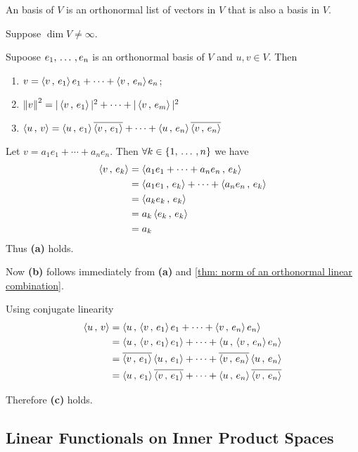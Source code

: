 \begin{mydef}
  An  basis of $V$ is an orthonormal list of vectors in $V$ that is also a basis in $V$.
\end{mydef}

\begin{mydef}
  Suppose $\dim V \neq \infty$.
\end{mydef}

\begin{thm}
  \label{thm: writing a vector as a linear combination of an orthonormal basis}

  Supoose $e_1, \ddd, e_n$ is an orthonormal basis of $V$ and $u,v \in V$. Then
  \begin{enumerate}[label=\textbf{(\alph*)}]
    \item $v=\ip{v}{e_1}e_1 + \cdots + \ip{v}{e_n}e_n$;
    \item $\norm{v}^2 = |\ip{v}{e_1}|^2 + \cdots + |\ip{v}{e_m}|^2$
    \item $\ip{u}{v} = \ip{u}{e_1} \overline{\ip{v}{e_1}} + \cdots + \ip{u}{e_n} \overline{\ip{v}{e_n}}$
  \end{enumerate}
\end{thm}
\begin{prf}
  Let $v=a_1 e_1 + \cdots + a_n e_n$. Then $\forall k \in \{1, \ddd, n\}$ we have
  \begin{equation}
    \begin{aligned}
      \ip{v}{e_k}
      &=\ip{a_1 e_1 + \cdots + a_n e_n}{e_k} \\
      &=\ip{a_1 e_1}{e_k} + \cdots + \ip{a_n e_n}{e_k}\\
      &=\ip{a_ke_k}{e_k} \\
      &= a_k\ip{e_k}{e_k} \\
      &=a_k
    \end{aligned}
  \end{equation}
  Thus \textbf{(a)} holds.

  Now \textbf{(b)} follows immediately from \textbf{(a)} and \ref{thm: norm of an orthonormal linear combination}.

  Using conjugate linearity
  \begin{equation}
    \begin{aligned}
      \ip{u}{v}
      &=\ip{u}{\ip{v}{e_1}e_1 + \cdots + \ip{v}{e_n}e_n} \\
      &= \ip{u}{\ip{v}{e_1}e_1} + \cdots + \ip{u}{\ip{v}{e_n}e_n} \\
      &= \overline{\ip{v}{e_1}}\ip{u}{e_1} + \cdots + \overline{\ip{v}{e_n}}\ip{u}{e_n} \\
      &= \ip{u}{e_1}\overline{\ip{v}{e_1}} + \cdots + \ip{u}{e_n}\overline{\ip{v}{e_n}}
    \end{aligned}
  \end{equation}

  Therefore \textbf{(c)} holds.
\end{prf}

\subsection{Linear Functionals on Inner Product Spaces}